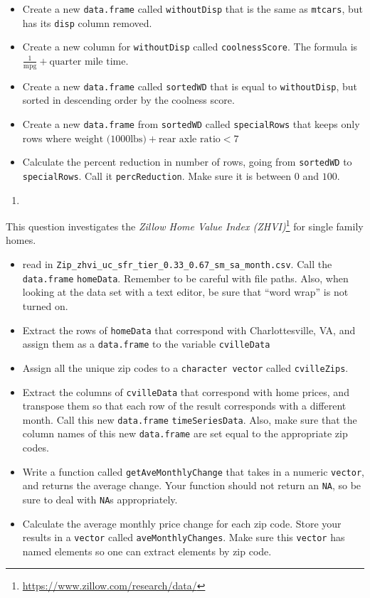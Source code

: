 \documentclass[
  12pt,
  krantz2]{krantz}
\providecommand{\tightlist}{%
  \setlength{\itemsep}{0pt}\setlength{\parskip}{0pt}}
\renewcommand{\href}[2]{#2\footnote{\url{#1}}}
\begin{document}
\begin{itemize}
\tightlist
\item
  Create a new \texttt{data.frame} called \texttt{withoutDisp} that is the same as \texttt{mtcars}, but has its \texttt{disp} column removed.
\item
  Create a new column for \texttt{withoutDisp} called \texttt{coolnessScore}. The formula is \(\frac{1}{\text{mpg}} + \text{quarter mile time}\).
\item
  Create a new \texttt{data.frame} called \texttt{sortedWD} that is equal to \texttt{withoutDisp}, but sorted in descending order by the coolness score.
\item
  Create a new \texttt{data.frame} from \texttt{sortedWD} called \texttt{specialRows} that keeps only rows where \(\text{weight (1000lbs)} + \text{rear axle ratio} < 7\)
\item
  Calculate the percent reduction in number of rows, going from \texttt{sortedWD} to \texttt{specialRows}. Call it \texttt{percReduction}. Make sure it is between \(0\) and \(100\).
\end{itemize}

\begin{enumerate}
\def\labelenumi{\arabic{enumi}.}
\setcounter{enumi}{2}
\tightlist
\item
\end{enumerate}

This question investigates the \href{https://www.zillow.com/research/data/}{\emph{Zillow Home Value Index (ZHVI)}} for single family homes.

\begin{itemize}
\tightlist
\item
  read in \texttt{Zip\_zhvi\_uc\_sfr\_tier\_0.33\_0.67\_sm\_sa\_month.csv}. Call the \texttt{data.frame} \texttt{homeData}. Remember to be careful with file paths. Also, when looking at the data set with a text editor, be sure that ``word wrap'' is not turned on.
\item
  Extract the rows of \texttt{homeData} that correspond with Charlottesville, VA, and assign them as a \texttt{data.frame} to the variable \texttt{cvilleData}
\item
  Assign all the unique zip codes to a \texttt{character\ vector} called \texttt{cvilleZips}.
\item
  Extract the columns of \texttt{cvilleData} that correspond with home prices, and transpose them so that each row of the result corresponds with a different month. Call this new \texttt{data.frame} \texttt{timeSeriesData}. Also, make sure that the column names of this new \texttt{data.frame} are set equal to the appropriate zip codes.
\item
  Write a function called \texttt{getAveMonthlyChange} that takes in a numeric \texttt{vector}, and returns the average change. Your function should not return an \texttt{NA}, so be sure to deal with \texttt{NA}s appropriately.
\item
  Calculate the average monthly price change for each zip code. Store your results in a \texttt{vector} called \texttt{aveMonthlyChanges}. Make sure this \texttt{vector} has named elements so one can extract elements by zip code.
\end{itemize}
\end{document}
